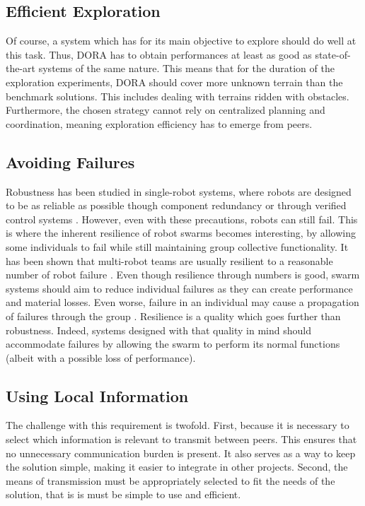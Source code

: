 \subsection{Efficient Exploration}
Of course, a system which has for its main objective to explore should do well at this task. Thus, \ac{DORA} has to obtain performances at least as good as state-of-the-art systems of the same nature. This means that for the duration of the exploration experiments, \ac{DORA} should cover more unknown terrain than the benchmark solutions. This includes dealing with terrains ridden with obstacles. Furthermore, the chosen strategy cannot rely on centralized planning and coordination, meaning exploration efficiency has to emerge from peers.

\subsection{Avoiding Failures}
Robustness has been studied in single-robot systems, where robots are designed to be as reliable as possible though component redundancy \cite{brooks1986robust} or through verified control systems \cite{lim1987robust,slotine1985robust,slotine1991applied}. However, even with these precautions, robots can still fail. This is where the inherent resilience of robot swarms becomes interesting, by allowing some individuals to fail while still maintaining group collective functionality. It has been shown that multi-robot teams are usually resilient to a reasonable number of robot failure \cite{ramachandran2019resilience,wehbe2021probabilistic,winfield2006safety}. Even though resilience through numbers is good, swarm systems should aim to reduce individual failures as they can create performance and material losses. Even worse, failure in an individual may cause a propagation of failures through the group \cite{prorok2021beyond}. Resilience is a quality which goes further than robustness. Indeed, systems designed with that quality in mind should accommodate failures by allowing the swarm to perform its normal functions (albeit with a possible loss of performance).

\subsection{Using Local Information}
The challenge with this requirement is twofold. First, because it is necessary to select which information is relevant to transmit between peers. This ensures that no unnecessary communication burden is present. It also serves as a way to keep the solution simple, making it easier to integrate in other projects. Second, the means of transmission must be appropriately selected to fit the needs of the solution, that is is must be simple to use and efficient.

